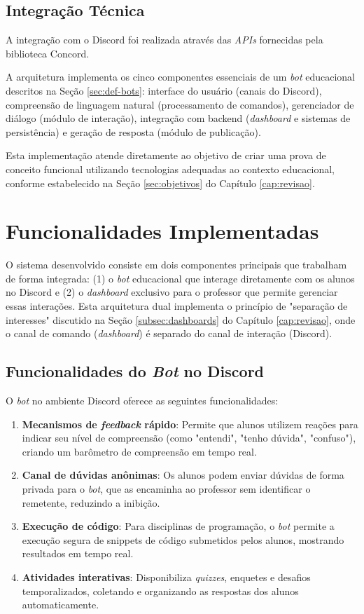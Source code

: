 \subsection{Integração Técnica}

A integração com o Discord foi realizada através das \textit{APIs} fornecidas
pela biblioteca Concord.

A arquitetura implementa os cinco componentes essenciais de um \textit{bot}
educacional descritos na Seção \ref{sec:def-bots}: interface do usuário (canais
do Discord), compreensão de linguagem natural (processamento de comandos),
gerenciador de diálogo (módulo de interação), integração com backend
(\textit{dashboard} e sistemas de persistência) e geração de resposta (módulo de
publicação).

Esta implementação atende diretamente ao objetivo de criar uma prova de conceito
funcional utilizando tecnologias adequadas ao contexto educacional, conforme
estabelecido na Seção \ref{sec:objetivos} do Capítulo \ref{cap:revisao}.

\section{Funcionalidades Implementadas}
\label{sec:funcionalidades}

O sistema desenvolvido consiste em dois componentes principais que trabalham de
forma integrada: (1) o \textit{bot} educacional que interage diretamente com os
alunos no Discord e (2) o \textit{dashboard} exclusivo para o professor que
permite gerenciar essas interações. Esta arquitetura dual implementa o princípio
de "separação de interesses" discutido na Seção \ref{subsec:dashboards} do
Capítulo \ref{cap:revisao}, onde o canal de comando (\textit{dashboard}) é
separado do canal de interação (Discord).

\subsection{Funcionalidades do \textit{Bot} no Discord}
O \textit{bot} no ambiente Discord oferece as seguintes funcionalidades:

\begin{enumerate}
\item \textbf{Mecanismos de \textit{feedback} rápido}: Permite que alunos
utilizem reações para indicar seu nível de compreensão (como "entendi", "tenho
dúvida", "confuso"), criando um barômetro de compreensão em tempo real.
\item \textbf{Canal de dúvidas anônimas}: Os alunos podem enviar dúvidas de
forma privada para o \textit{bot}, que as encaminha ao professor sem identificar
o remetente, reduzindo a inibição.
\item \textbf{Execução de código}: Para disciplinas de programação, o
\textit{bot} permite a execução segura de snippets de código submetidos pelos
alunos, mostrando resultados em tempo real.
\item \textbf{Atividades interativas}: Disponibiliza \textit{quizzes}, enquetes
e desafios temporalizados, coletando e organizando as respostas dos alunos
automaticamente.
\end{enumerate}

